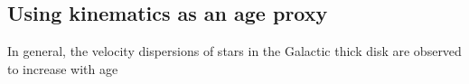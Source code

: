 
\subsection{Using kinematics as an age proxy}

In general, the velocity dispersions of stars in the Galactic thick disk are
observed to increase with age \citep[\eg][]{casagrande2011, aumer2009}


